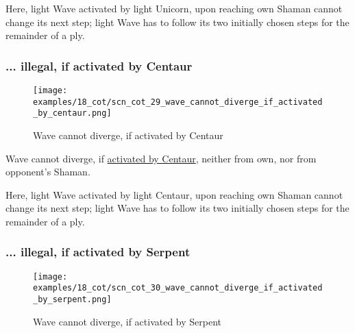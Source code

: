 Here, light Wave activated by light Unicorn, upon reaching own Shaman cannot change
its next step; light Wave has to follow its two initially chosen steps for the
remainder of a ply.

\clearpage %

\subsubsection*{... illegal, if activated by Centaur}
\label{sec:Conquest of Tlalocan/Divergence/... illegal, if activated by Centaur}

\vspace*{-1.4\baselineskip}
\noindent
\begin{figure}[!h]
\texttt{[image: examples/18\_cot/scn\_cot\_29\_wave\_cannot\_diverge\_if\_activated\_by\_centaur.png]}
\vspace*{-1.3\baselineskip}
\caption{Wave cannot diverge, if activated by Centaur}
\label{fig:scn_cot_29_wave_cannot_diverge_if_activated_by_centaur}
\end{figure}

\vspace*{-0.5\baselineskip}
Wave cannot diverge, if
\hyperref[fig:scn_hd_07_wave_activation_by_centaur_first_step]{activated by Centaur},
neither from own, nor from opponent's Shaman.

Here, light Wave activated by light Centaur, upon reaching own Shaman cannot change
its next step; light Wave has to follow its two initially chosen steps for the
remainder of a ply.

\clearpage %

\subsubsection*{... illegal, if activated by Serpent}
\label{sec:Conquest of Tlalocan/Divergence/... illegal, if activated by Serpent}

\vspace*{-1.4\baselineskip}
\noindent
\begin{figure}[!h]
\texttt{[image: examples/18\_cot/scn\_cot\_30\_wave\_cannot\_diverge\_if\_activated\_by\_serpent.png]}
\vspace*{-1.3\baselineskip}
\caption{Wave cannot diverge, if activated by Serpent}
\label{fig:scn_cot_30_wave_cannot_diverge_if_activated_by_serpent}
\end{figure}

